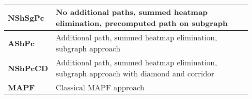\begin{table}[H]
\begin{center}
\begin{tabular}{ | p{2cm} | p{8cm}|  }
        \hline
        \textbf{NShSgPc} & No additional paths, summed heatmap elimination, precomputed path on subgraph \\
        \hline
        \textbf{AShPc} & Additional path, summed heatmap elimination, subgraph approach \\
        \hline
        \textbf{NShPcCD} & Additional path, summed heatmap elimination, subgraph approach with diamond and corridor \\
        \hline
        \textbf{MAPF} & Classical MAPF approach \\
        \hline
    \end{tabular}
    \end{center}
    \end{table}